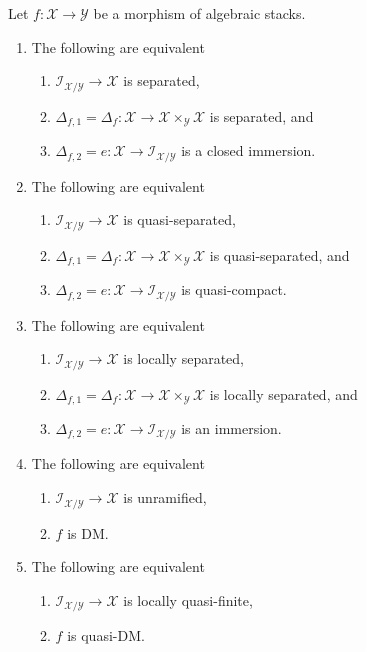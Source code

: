 \begin{lemma}
\label{lemma-diagonal-diagonal}
Let $f : \mathcal{X} \to \mathcal{Y}$ be a morphism of algebraic stacks.
\begin{enumerate}
\item
The following are equivalent
\begin{enumerate}
\item $\mathcal{I}_{\mathcal{X}/\mathcal{Y}} \to \mathcal{X}$
is separated,
\item $\Delta_{f, 1} = \Delta_f :
\mathcal{X} \to \mathcal{X} \times_\mathcal{Y} \mathcal{X}$
is separated, and
\item $\Delta_{f, 2} = e :
\mathcal{X} \to \mathcal{I}_{\mathcal{X}/\mathcal{Y}}$
is a closed immersion.
\end{enumerate}
\item
The following are equivalent
\begin{enumerate}
\item $\mathcal{I}_{\mathcal{X}/\mathcal{Y}} \to \mathcal{X}$
is quasi-separated,
\item $\Delta_{f, 1} = \Delta_f :
\mathcal{X} \to \mathcal{X} \times_\mathcal{Y} \mathcal{X}$
is quasi-separated, and
\item $\Delta_{f, 2} = e :
\mathcal{X} \to \mathcal{I}_{\mathcal{X}/\mathcal{Y}}$
is quasi-compact.
\end{enumerate}
\item
The following are equivalent
\begin{enumerate}
\item $\mathcal{I}_{\mathcal{X}/\mathcal{Y}} \to \mathcal{X}$
is locally separated,
\item $\Delta_{f, 1} = \Delta_f :
\mathcal{X} \to \mathcal{X} \times_\mathcal{Y} \mathcal{X}$
is locally separated, and
\item $\Delta_{f, 2} = e :
\mathcal{X} \to \mathcal{I}_{\mathcal{X}/\mathcal{Y}}$
is an immersion.
\end{enumerate}
\item
The following are equivalent
\begin{enumerate}
\item $\mathcal{I}_{\mathcal{X}/\mathcal{Y}} \to \mathcal{X}$
is unramified,
\item $f$ is DM.
\end{enumerate}
\item
The following are equivalent
\begin{enumerate}
\item $\mathcal{I}_{\mathcal{X}/\mathcal{Y}} \to \mathcal{X}$
is locally quasi-finite,
\item $f$ is quasi-DM.
\end{enumerate}
\end{enumerate}
\end{lemma}


